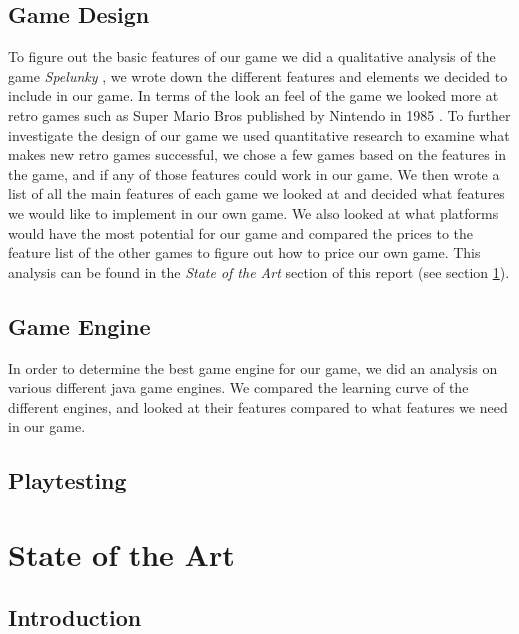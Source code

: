 \documentclass[12p]{article}
\begin{document}
\subsection{Game Design}

To figure out the basic features of our game we did a qualitative analysis of the game \emph{Spelunky} \cite{Spelunky}, we wrote down the different features and elements we decided to include in our game. In terms of the look an feel of the game we looked more at retro games such as Super Mario Bros published by Nintendo in 1985 \cite{SuperMarioBros}. To further investigate the design of our game we used quantitative research to examine what makes new retro games successful, we chose a few games based on the features in the game, and if any of those features could work in our game. We then wrote a list of all the main features of each game we looked at and decided what features we would like to implement in our own game. We also looked at what platforms would have the most potential for our game and compared the prices to the feature list of the other games to figure out how to price our own game. This analysis can be found in the \emph{State of the Art} section of this report (see section \ref{sec:StateOfTheArt}).

\subsection{Game Engine}

In order to determine the best game engine for our game, we did an analysis on various different java game engines. We compared the learning curve of the different engines, and looked at their features compared to what features we need in our game.

\subsection{Playtesting}




\newpage
\section{State of the Art} \label{sec:StateOfTheArt}
\subsection{Introduction}
\end{document}

